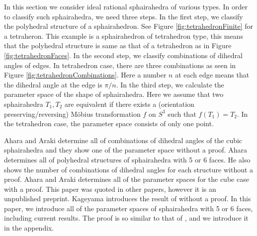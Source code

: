 \documentclass[suppldata, dvipdfmx]{interact}
\theoremstyle{plain}%
\theoremstyle{definition}
\theoremstyle{remark}
\theoremstyle{problemstyle}
\newtheorem{problem}{Problem}[section] %
\begin{document}


In this section we consider ideal rational sphairahedra of various types. 
In order to classify such sphairahedra, we need three steps.  In the first step, we classify the polyhedral structure of a sphairahedron.  See Figure \ref{fig:tetrahedronFinite} for a tetraheron.  This example is a sphairahedron of tetrahedron type, this means that the polyhedral structure is same as that of a tetrahedron as in Figure \ref{fig:tetrahedronFaces}.  
In the second step, we classify combinations of dihedral angles of edges.  In tetrahedron case, there are three combinations as seen in Figure \ref{fig:tetrahedronCombinations}.  Here a number $n$ at each edge means that the dihedral angle at the edge is $\pi / n$. 
In the third step, we calculate the parameter space of the shape of sphairahedra.  Here we assume that two sphairahedra $T_1, T_2$ are equivalent if there exists a (orientation preserving/reversing) M\"obius transformation $f$ on $S^3$ such that $f(T_1) = T_2$.  In the tetrahedron case, the parameter space consists of only one point.  

Ahara and Araki \cite{AharaAraki} determine all of combinations of dihedral angles of the cubic sphairahedra and they show one of the parameter space without a proof.  
Ahara \cite{AharaJa} determines all of polyhedral structures of sphairahedra with 5 or 6 faces.  He also shows the number of combinations of dihedral angles for each structure without a proof.  
Ahara and Araki \cite{AharaAraki2} determines all of the parameter spaces for the cube case with a proof.  This paper was quoted in other papers, however it is an unpublished preprint.
Kageyama \cite{kageyama} introduces the result of \cite{AharaAraki2} without a proof. 
In this paper, we introduce all of the parameter spaces of sphairahedra with 5 or 6 faces, including current results. The proof is so similar to that of \cite{AharaAraki2}, and we introduce it in the appendix.
\end{document}
